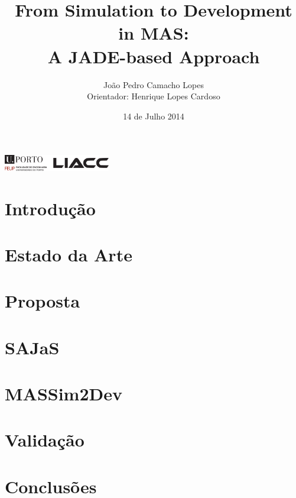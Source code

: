\documentclass[xcolor=x11names,compress]{beamer}
\title{\texorpdfstring{From Simulation to Development in MAS:\\
		A JADE-based Approach}{}}
\author{\texorpdfstring{João Pedro Camacho Lopes\\
		Orientador: Henrique Lopes Cardoso}{}}
\renewcommand{\(}{\begin{columns}}
\renewcommand{\)}{\end{columns}}
\newcommand{\<}[1]{\begin{column}{#1}}
\renewcommand{\>}{\end{column}}
\begin{document}
\begin{frame}
\includegraphics[height=0.7cm]{figures/uporto-feup.pdf}\\

\vspace{1cm}

\date{14 de Julho 2014}
\titlepage
\end{frame}

\section{Introdução}


\section{Estado da Arte}


\section{Proposta}


\section{SAJaS}


\section{MASSim2Dev}


\section{Validação}


\section{Conclusões}

\end{document}
